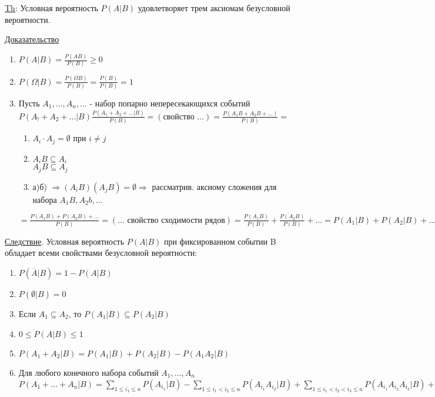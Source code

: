 \underline{Th}: Условная вероятность $P(A|B)$ удовлетворяет трем аксиомам безусловной вероятности.


\underline{Доказательство}
\begin{enumerate}
	\item[1)]
	$P(A|B) = \frac{P(AB)}{P(B)} \geqslant 0$
	
	\item[2)]
	$P(\Omega|B) = \frac{P(\Omega B)}{P(B)} = \frac{P(B)}{P(B)} = 1$
	
	\item[3)]
	Пусть $A_1, \ldots , A_n, \ldots$ - набор попарно непересекающихся событий \\
	$P(A_! + A_2 + \ldots |B) \frac{P(A_1 + A_2 + \ldots |B)}{P(B)} = (\text{свойство ...}) = \frac{P(A_1 B + A_2 B + \ldots)}{P(B)} = $
	\begin{enumerate}
		\item[а)]
		$A_i \cdot A_j = \emptyset$ при $i \neq j$
		
		\item[б)]
		$A_i B \subseteq A_i$ \\
		$A_j B \subseteq A_j$ \\
		
		\item[в)]
		а)б) $\Rightarrow (A_i B)(A_j B) = \emptyset \Rightarrow$ рассматрив. аксиому сложения для набора $A_1 B, A_2 b, \ldots$
	\end{enumerate}
	$= \frac{P(A_1 B) + P(A_2 B) + \ldots}{P(B)} = (\text{... свойство сходимости рядов}) = \frac{P(A_1 B)}{P(B)} + \frac{P(A_2 B)}{P(B)} + \ldots = P(A_1|B) + P(A_2|B) + \ldots$
\end{enumerate}

\underline{Следствие}. Условная вероятность $P(A|B)$  при фиксированном событии B обладает всеми свойствами безусловной вероятности:
\begin{enumerate}
	\item[$1^o$]
	$P(\overline{A}|B) = 1 - P(A|B)$
	
	\item[$2^o$]
	$P(\emptyset|B) = 0$
	
	\item[$3^o$]
	Если $A_1 \subseteq A_2$, то $P(A_1|B) \subseteq P(A_2|B)$
	
	\item[$4^o$]
	$0 \leqslant P(A|B) \leqslant 1$
	
	\item[$5^o$]
	$P(A_1 + A_2 |B) = P(A_1|B) + P(A_2|B) - P(A_1 A_2|B)$
	
	\item[$6^o$]
	Для любого конечного набора событий $A_1, \ldots, A_n$ \\
	$P(A_1 + \ldots + A_n|B) = 
	\sum\limits_{1 \leqslant i_1 \leqslant n} P(A_{i_1}|B) - 
	\sum\limits_{1 \leqslant i_1 < i_2 \leqslant n} P(A_{i_1} A_{i_2}|B) + 
	\sum\limits_{1 \leqslant i_1 < i_2 < i_3 \leqslant n} P(A_{i_1} A_{i_2} A_{i_3}|B) + \ldots + 
	(-1)^{n-1} P(A_1 \cdot A_2 \cdot \ldots \cdot A_n|B)$
\end{enumerate}

